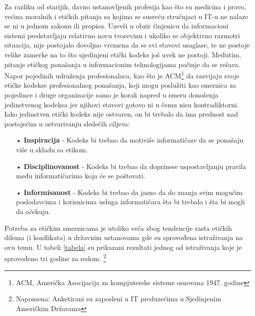 \documentclass[a4paper]{article}
\begin{document}
{Za razliku od starijih, davno ustanovljenih profesija kao što su medicina i pravo, većina moralnih i etičkih pitanja sa kojima se susreću stručnjaci u IT-u ne nalaze se ni u jednom zakonu ili propisu. Uzevši u obzir činjenicu da informacioni sistemi predstavljaju relativno novu tvorevinu i ukoliko se objektivno razmotri situacija, nije postojalo dovoljno vremena da se svi stavovi usaglase, te ne postoje velike zamerke na to što ujedinjeni etički kodeks još uvek ne postoji. 
Međutim, pitanje etičkog ponašanja u informacionim tehnologijama počinje da se rešava. Napor pojedinih udruženja profesionalaca, kao što je ACM\footnote{ACM, Američka Asocijacija za kompjuterske sisteme osnovana 1947. godine} da razvijaju svoje etičke kodekse profesionalnog ponašanja, koji mogu poslužiti kao smernica za pojedince i druge organizacije samo je korak napred u smeru donošenja jedinstvenog kodeksa jer njihovi stavovi gotovo ni u čemu nisu kontradiktorni.
\\
Iako jedinstven etički kodeks nije ostvaren, on bi trebalo da ima prednost nad postojećim u ostvarivanju sledećih ciljeva:
\\
\begin{itemize}
\item[•] \textbf{Inspiracija} - Kodeks bi trebao da motiviše informatičare da se ponašaju više u skladu sa etikom.
\item[•] \textbf{Disciplinovanost} - Kodeks bi trebao da doprinese uspostavljanju pravila među informatičarima koja će se poštovati.
\item[•] \textbf{Informisanost} - Kodeks bi trebao da jasno da do znanja svim mogućim poslodavcima i korisnicima usluga informatičara šta bi trebalo i šta bi mogli da očekuju.
\end{itemize}

%
Potreba za etičkim smernicama je utoliko veća zbog tendencije rasta etičkih dilema (i konflikata) u državnim ustanovama gde su sprovođena istraživanja na ovu temu.
U tabeli \ref{tabela} su prikazani rezultati jednog od istraživanja koje je sprovođeno tri godine za redom.
\footnote{Napomena: Anketirani su zaposleni u IT preduzećima u Sjedinjenim Američkim Državama}

}
\end{document}
